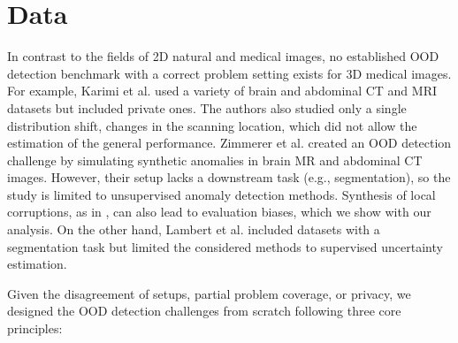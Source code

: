 


\section{Data}

In contrast to the fields of 2D natural and medical images, no established OOD detection benchmark with a correct problem setting exists for 3D medical images. For example, Karimi et al. \cite{karimi2022improving} used a variety of brain and abdominal CT and MRI datasets but included private ones. The authors also studied only a single distribution shift, changes in the scanning location, which did not allow the estimation of the general performance. Zimmerer et al. \cite{david_zimmerer_2022_6362313} created an OOD detection challenge by simulating synthetic anomalies in brain MR and abdominal CT images. However, their setup lacks a downstream task (e.g., segmentation), so the study is limited to unsupervised anomaly detection methods. Synthesis of local corruptions, as in \cite{david_zimmerer_2022_6362313}, can also lead to evaluation biases, which we show with our analysis. On the other hand, Lambert et al. \cite{lambert2022improving} included datasets with a segmentation task but limited the considered methods to supervised uncertainty estimation.

Given the disagreement of setups, partial problem coverage, or privacy, we designed the OOD detection challenges from scratch following three core principles:

